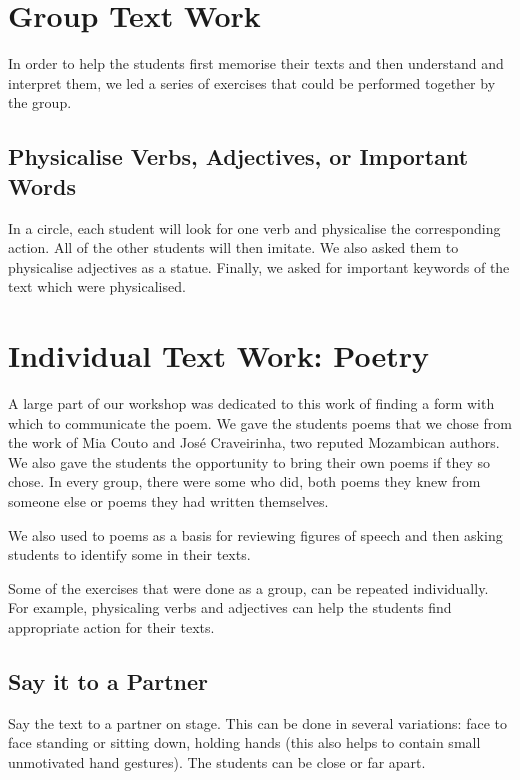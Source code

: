 \documentclass[article,twocolumn,twoside]{memoir}
\begin{document}
\section{Group Text Work}

In order to help the students first memorise their texts and then understand
and interpret them, we led a series of exercises that could be performed
together by the group.

\subsection{Physicalise Verbs, Adjectives, or Important Words}

In a circle, each student will look for one verb and physicalise the
corresponding action. All of the other students will then imitate. We also
asked them to physicalise adjectives as a statue. Finally, we asked for
important keywords of the text which were physicalised.

\section{Individual Text Work: Poetry}

A large part of our workshop was dedicated to this work of finding a form with
which to communicate the poem. We gave the students poems that we chose from
the work of Mia Couto and José Craveirinha, two reputed Mozambican authors. We
also gave the students the opportunity to bring their own poems if they so
chose. In every group, there were some who did, both poems they knew from
someone else or poems they had written themselves.

We also used to poems as a basis for reviewing figures of speech and then
asking students to identify some in their texts.

Some of the exercises that were done as a group, can be repeated individually.
For example, physicaling verbs and adjectives can help the students find
appropriate action for their texts.

\subsection{Say it to a Partner}

Say the text to a partner on stage. This can be done in several variations:
face to face standing or sitting down, holding hands (this also helps to
contain small unmotivated hand gestures). The students can be close or far apart.
\end{document}
